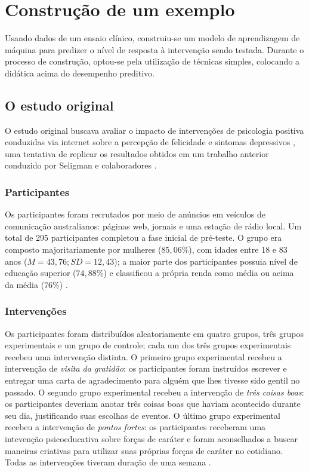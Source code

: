 \section{Construção de um exemplo}

Usando dados de um ensaio clínico, construiu-se um modelo de aprendizagem de máquina para predizer o nível de resposta à intervenção sendo testada.
Durante o processo de construção, optou-se pela utilização de técnicas simples, colocando a didática acima do desempenho preditivo.

\subsection{O estudo original}

O estudo original buscava avaliar o impacto de intervenções de psicologia positiva conduzidas via internet sobre a percepção de felicidade e
sintomas depressivos \cite{Woodworth2017}, uma tentativa de replicar os resultados obtidos em um trabalho anterior conduzido por Seligman e
colaboradores \cite{Seligman2005}.

\subsubsection{Participantes}

Os participantes foram recrutados por meio de anúncios em veículos de comunicação australianos: páginas web, jornais e uma estação de rádio
local. Um total de 295 participantes completou a fase inicial de pré-teste. O grupo era composto majoritariamente por mulheres ($85,06\%$),
com idades entre 18 e 83 anos ($M=43,76; SD=12,43$); a maior parte dos participantes possuia nível de educação superior ($74,88\%$) e classificou
a própria renda como média ou acima da média ($76\%$) \cite{Woodworth2017, Collins2023}.

\subsubsection{Intervenções}

Os participantes foram distribuídos aleatoriamente em quatro grupos, três grupos experimentais e um grupo de controle; cada um dos três grupos
experimentais recebeu uma intervenção distinta. O primeiro grupo experimental recebeu a intervenção de \emph{visita da gratidão}: os participantes
foram instruídos escrever e entregar uma carta de agradecimento para alguém que lhes tivesse sido gentil no passado. O segundo grupo experimental
recebeu a intervenção de \emph{três coisas boas}: os participantes deveriam anotar três coisas boas que haviam acontecido durante seu dia, justificando
suas escolhas de eventos. O último grupo experimental recebeu a intervenção de \emph{pontos fortes}: os participantes receberam uma intevenção
psicoeducativa sobre forças de caráter e foram aconselhados a buscar maneiras criativas para utilizar suas próprias forças de caráter no cotidiano.
Todas as intervenções tiveram duração de uma semana \cite{Woodworth2017}.

